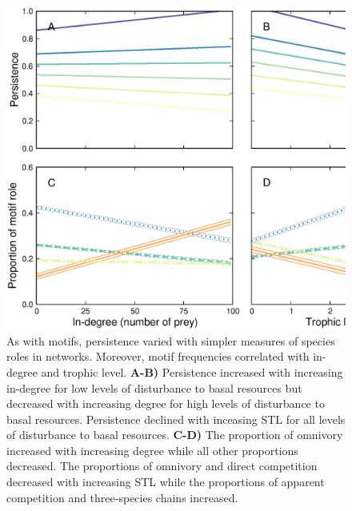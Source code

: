 \documentclass[12pt]{article}
\begin{document}
\begin{spacing}{2.0}
            \begin{figure}
                \centering
                \includegraphics[width=\textwidth]{figures/roles_vs_TL.eps}
                \caption{As with motifs, persistence varied with simpler measures of species roles in networks. Moreover, motif frequencies correlated with in-degree and trophic level. \textbf{A-B)} Persistence increased with increasing in-degree for low levels of disturbance to basal resources but decreased with increasing degree for high levels of disturbance to basal resources.
                Persistence declined with inceasing STL for all levels of disturbance to basal resources.
                \textbf{C-D)} The proportion of omnivory increased with increasing degree while all other proportions decreased. The proportions of omnivory and direct competition decreased with increasing STL while the proportions of apparent competition and three-species chains increased.}
                \label{fig:motifs_vs_TL_and_deg}
            \end{figure}        
        



\end{spacing}
\end{document}
